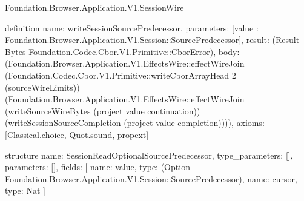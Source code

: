 \begin{lexlean}{Foundation.Browser.Application.V1.SessionWire}
\begin{semanticmodule}
definition{
  name: writeSessionSourcePredecessor,
  parameters: [value : Foundation.Browser.Application.V1.Session::SourcePredecessor],
  result: (Result Bytes Foundation.Codec.Cbor.V1.Primitive::CborError),
  body: (Foundation.Browser.Application.V1.EffectsWire::effectWireJoin (Foundation.Codec.Cbor.V1.Primitive::writeCborArrayHead 2 (sourceWireLimits)) (Foundation.Browser.Application.V1.EffectsWire::effectWireJoin (writeSourceWireBytes (project value continuation)) (writeSessionSourceCompletion (project value completion)))),
  axioms: [Classical.choice, Quot.sound, propext]
}

structure{
  name: SessionReadOptionalSourcePredecessor,
  type_parameters: [],
  parameters: [],
  fields: [
    {name: value, type: (Option Foundation.Browser.Application.V1.Session::SourcePredecessor)},
    {name: cursor, type: Nat}
  ]
}


\end{semanticmodule}
\end{lexlean}
